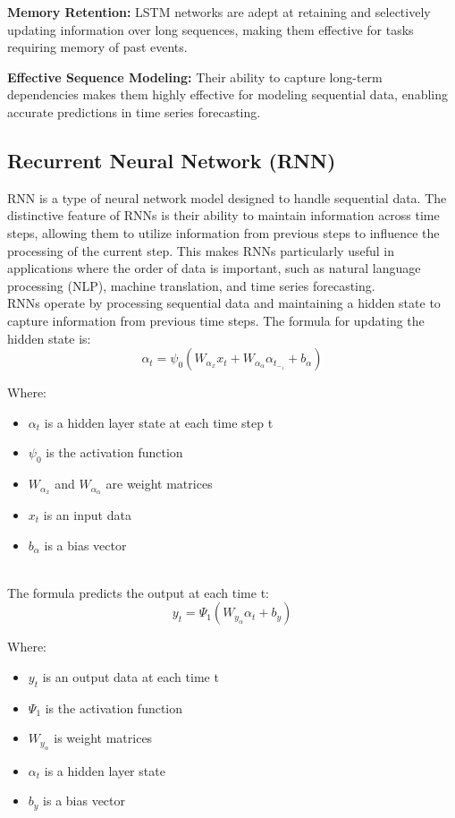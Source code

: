 \documentclass{ieeeojies}
\begin{document}
\textbf{Memory Retention:} LSTM networks are adept at retaining and selectively updating information over long sequences, making them effective for tasks requiring memory of past events.
  
\textbf{Effective Sequence Modeling:} Their ability to capture long-term dependencies makes them highly effective for modeling sequential data, enabling accurate predictions in time series forecasting.



\subsection{Recurrent Neural Network (RNN)}
RNN is a type of neural network model designed to handle sequential data. The distinctive feature of RNNs is their ability to maintain information across time steps, allowing them to utilize information from previous steps to influence the processing of the current step. This makes RNNs particularly useful in applications where the order of data is important, such as natural language processing (NLP), machine translation, and time series forecasting. \\
RNNs operate by processing sequential data and maintaining a hidden state to capture information from previous time steps. The formula for updating the hidden state is:
\[ \alpha_t=\psi_0(W_\alpha_xx_t + W_\alpha_\alpha\alpha_t_-_1 + b_\alpha) \]

Where:\\
    \begin{itemize}
        \item $\alpha_t$ is a hidden layer state at each time step t
        \item $\psi_0$ is the activation function
        \item $W_\alpha_x$ and $W_\alpha_\alpha$ are weight matrices
        \item $x_t$ is an input data
        \item $b_\alpha$ is a bias vector
    \end{itemize}\\

The formula predicts the output at each time t:\\
\[ y_t = \Psi_1(W_y_\alpha\alpha_t + b_y) \]

Where:\\
    \begin{itemize}
        \item $y_t$ is an output data at each time t
        \item $\Psi_1$ is the activation function
        \item $W_y_\alpha$ is weight matrices
        \item $\alpha_t$ is a hidden layer state
        \item $b_y$ is a bias vector
    \end{itemize}
\end{document}
